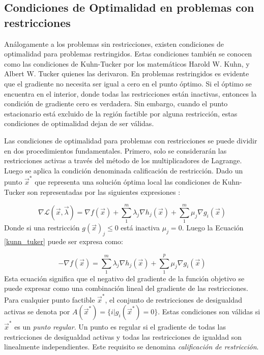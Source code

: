 \subsection{Condiciones de Optimalidad en problemas con restricciones}
Análogamente a los problemas sin restricciones, existen condiciones de optimalidad para problemas restringidos. Estas condiciones también se conocen como las condiciones de Kuhn-Tucker por los matemáticos  Harold W. Kuhn, y  Albert W. Tucker quienes las derivaron. En problemas restringidos es evidente que el gradiente no necesita ser igual a cero en el punto óptimo.  Si el óptimo se encuentra en el interior, donde todas las restricciones están inactivas, entonces la condición de gradiente cero es verdadera. Sin embargo, cuando el punto estacionario está excluido de la región factible por alguna restricción, estas condiciones de optimalidad dejan de ser válidas. 

Las condiciones de optimalidad para problemas con restricciones se puede dividir en dos procedimientos fundamentales. Primero, solo se considerarán las restricciones activas a través del método de los multiplicadores de Lagrange. Luego se aplica la condición denominada calificación de restricción. 
Dado un punto $\vec{x}^*$ que representa una solución óptima local las condiciones de Kuhn-Tucker son representadas por las siguientes expresiones \cite{arora_optimization:_2015}:

\begin{equation}
\nabla \mathcal{L} (\vec{x},\vec{\lambda})= \nabla f(\vec{x})+ \sum_{1}^m \lambda_j  \nabla h_j(\vec{x})+ \sum_{1}^m \mu_j  \nabla g_i(\vec{x})
\label{kunn_tuker}
\end{equation}
Donde si una restricción $g(\vec{x})_j\leq 0$ está inactiva $\mu_j =0$. Luego la Ecuación \ref{kunn_tuker} puede ser expresa como:  

\begin{equation}
-\nabla f(\vec{x})=  \sum_{1}^m \lambda_j  \nabla h_j(\vec{x})+ \sum_{1}^p \mu_j  \nabla g_i(\vec{x})
\label{kunn_tuker2}
\end{equation}
Esta ecuación significa que el negativo del gradiente de la función objetivo se puede expresar como una combinación lineal del gradiente de las restricciones. Para cualquier punto factible $\vec{x}^*$, el conjunto de restricciones de desigualdad activas se denota por $  A(\vec{x}^*) = \big\{  i|g_i(\vec{x}^*)=0 \big\} $.
Estas condiciones son válidas si $\vec{x}^*$ es un \textit{punto regular}. Un punto es regular si el gradiente de todas las restricciones de desigualdad activas y todas las restricciones de igualdad son linealmente independientes. Este requisito se denomina \textit{calificación de restricción}. 

